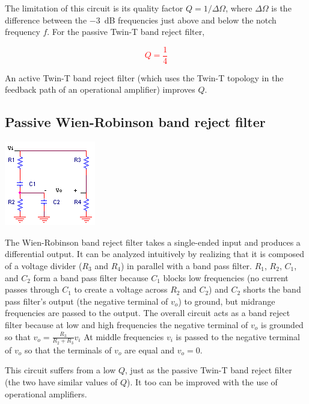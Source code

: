 The limitation of this circuit is its quality factor $Q = 1/\Delta\Omega$, where $\Delta\Omega$ is the difference between the \SI{-3}{\dB} frequencies just above and below the notch frequency $f$.
For the passive Twin-T band reject filter,

\textcolor{red}{
\begin{equation}
Q = \frac{1}{4}
\label{passiveTwinT_Q}
\end{equation}
}

An active Twin-T band reject filter (which uses the Twin-T topology in the feedback path of an operational amplifier) improves $Q$. \autocite[321]{op-amps-for-everyone}

\subsection{Passive Wien-Robinson band reject filter}
\begin{center}
	\includegraphics{schematics/passiveWien-Robinsonbandrejectfilter.PNG}
\end{center}
The Wien-Robinson band reject filter takes a single-ended input and produces a differential output. It can be analyzed intuitively by realizing that it is composed of a voltage divider ($R_{3}$ and $R_{4}$) in parallel with a band pass filter. $R_{1}$, $R_{2}$, $C_{1}$, and $C_{2}$ form a band pass filter because $C_{1}$ blocks low frequencies (no current passes through $C_{1}$ to create a voltage across $R_{2}$ and $C_{2}$) and $C_{2}$ shorts the band pass filter's output (the negative terminal of $v_{o}$) to ground, but midrange frequencies are passed to the output. The overall circuit acts as a band reject filter because at low and high frequencies the negative terminal of $v_{o}$ is grounded so that $v_{o} = \frac{R_{3}}{R_{2}+R_{3}}v_{i}$
At middle frequencies $v_{i}$ is passed to the negative terminal of $v_{o}$ so that the terminals of $v_{o}$ are equal and $v_{o} = 0$.

This circuit suffers from a low $Q$, just as the passive Twin-T band reject filter (the two have similar values of $Q$). \autocite[323]{op-amps-for-everyone}
It too can be improved with the use of operational amplifiers.

